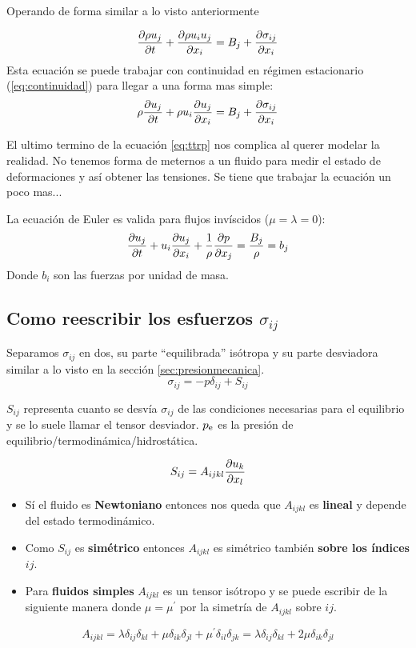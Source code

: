 Operando de forma similar a lo visto anteriormente

\begin{equation} \label{eq:ttrpTransitorio}
\frac{\partial \rho u_j}{\partial t}+\frac{\partial \rho u_i u_j}{\partial x_i}=B_j+\frac{\partial \sigma_{ij}}{\partial x_i}
\end{equation}
Esta ecuación se puede trabajar con continuidad en régimen estacionario (\ref{eq:continuidad}) para llegar a una forma mas simple:
\begin{equation} \label{eq:ttrp}
    \rho \frac{\partial u_j}{\partial t} +\rho u_i \frac{\partial u_j}{\partial x_i}=B_j+\frac{\partial \sigma_{ij}}{\partial x_i}
\end{equation}

El ultimo termino de la ecuación \ref{eq:ttrp} nos complica al querer modelar la realidad. No tenemos forma de meternos a un fluido para medir el estado de deformaciones y así obtener las tensiones. Se tiene que trabajar la ecuación un poco mas...
\begin{mdframed}
La ecuación de Euler es valida para flujos invíscidos ($\mu=\lambda=0$):
\begin{equation} \label{eq:eulerDiff}
    \frac{\partial u_j}{\partial t}+u_i\frac{\partial u_j}{\partial x_i}+\frac{1}{\rho}\frac{\partial p}{\partial x_j}=\frac{B_j}{\rho}=b_j
\end{equation}
Donde $b_i$ son las fuerzas por unidad de masa.
\end{mdframed}
\subsection{Como reescribir los esfuerzos $\sigma_{ij}$}
Separamos $\sigma_{ij}$ en dos, su parte ``equilibrada'' isótropa y su parte desviadora similar a lo visto en la sección \ref{sec:presionmecanica}. 
\begin{equation}\label{eq:sigma1}
\sigma_{ij}=-p \delta_{ij} +S_{ij}
\end{equation}


$S_{ij}$ representa cuanto se desvía $\sigma_{ij}$ de las condiciones necesarias para el equilibrio y se lo suele llamar el tensor desviador. $\pe$ es la presión de equilibrio/termodinámica/hidrostática.

\[S_{ij}=A_{ijkl}\frac{\partial u_k}{\partial x_l} \]

\begin{itemize}
\item Sí el fluido es \textbf{Newtoniano} entonces nos queda que $A_{ijkl}$ es \textbf{lineal} y depende del estado termodinámico.

\item Como $S_{ij}$ es \textbf{simétrico} entonces $A_{ijkl}$ es simétrico también \textbf{sobre los índices }$ij$. 

\item Para \textbf{fluidos simples} $A_{ijkl}$ es un tensor isótropo y se puede escribir de la siguiente manera donde $\mu=\mu^\prime$ por la simetría de $A_{ijkl}$ sobre $ij$.
\end{itemize}
\begin{equation} \label{eq:Aijklexpanded}
    A_{ijkl}=\lambda\delta_{ij}\delta_{kl} +\mu\delta_{ik}\delta_{jl}+\mu^\prime \delta_{il}\delta_{jk}=\lambda\delta_{ij}\delta_{kl} +2\mu\delta_{ik}\delta_{jl}
\end{equation}


